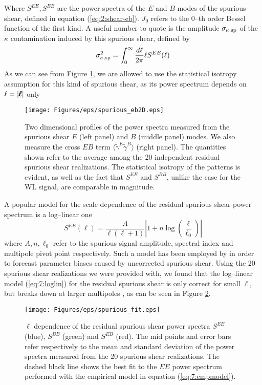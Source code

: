 %
Where $S^{EE}, S^{BB}$ are the power spectra of the $E$ and $B$ modes of the spurious shear, defined in equation (\ref{eq:2:shear-eb}). $J_0$ refers to the 0--th order Bessel function of the first kind. A useful number to quote is the amplitude $\sigma_{\kappa,{\rm sp}}$ of the $\kappa$ contamination induced by this spurious shear, defined by
\begin{equation}
\label{eq:7:sigmasys}
\sigma^2_{\kappa,{\rm sp}} = \int_0^\infty \frac{d\ell}{2\pi}\ell S^{EE}(\ell) 
\end{equation}
%
As we can see from Figure \ref{fig:7:eb2d}, we are allowed to use the statistical isotropy assumption for this kind of spurious shear, as its power spectrum depends on $\ell=\vert\pmb{\ell}\vert$ only
%
\begin{figure}
\begin{center}
\texttt{[image: Figures/eps/spurious\_eb2D.eps]}
\end{center}
\caption{Two dimensional profiles of the power spectra measured from the spurious shear $E$ (left panel) and $B$ (middle panel) modes. We also measure the cross $EB$ term $\langle\tilde{\gamma}^E\tilde{\gamma}^B\rangle$ (right panel). The quantities shown refer to the average among the 20 independent residual spurious shear realizations. The statistical isotropy of the patterns is evident, as well as the fact that $S^{EE}$ and $S^{BB}$, unlike the case for the WL signal, are comparable in magnitude.}
\label{fig:7:eb2d}
\end{figure} 
%
A popular model for the scale dependence of the residual spurious shear power spectrum \citep{AmaraSP} is a log--linear one
\begin{equation}
\label{eq:7:loglin}
S^{EE}(\ell) = \frac{A}{\ell(\ell+1)}\left\vert1+n\log\left(\frac{\ell}{\ell_0}\right)\right\vert
\end{equation}
%
where $A,n,\ell_0$ refer to the spurious signal amplitude, spectral index and multipole pivot point respectively. Such a model has been employed by \citep{AmaraSP} in order to forecast parameter biases caused by uncorrected spurious shear. Using the 20 spurious shear realizations we were provided with, we found that the log--linear model (\ref{eq:7:loglin}) for the residual spurious shear is only correct for small $\ell$, but breaks down at larger multipoles \citep{PetriSpShear}, as can be seen in Figure \ref{fig:7:spfit}. 
%
\begin{figure}
\begin{center}
\texttt{[image: Figures/eps/spurious\_fit.eps]}
\end{center}
\caption{$\ell$ dependence of the residual spurious shear power spectra $S^{EE}$ (blue), $S^{BB}$ (green) and $S^{EB}$ (red). The mid points and error bars refer respectively to the mean and standard deviation of the power spectra measured from the 20 spurious shear realizations. The dashed black line shows the best fit to the $EE$ power spectrum performed with the empirical model in equation (\ref{eq:7:empmodel}).}
\label{fig:7:spfit}
\end{figure} 

